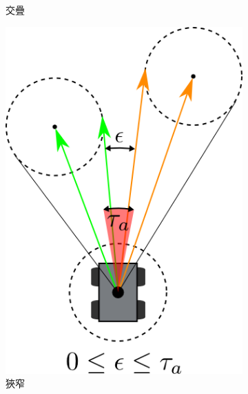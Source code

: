 \begin{figure}[h!]
\begin{subfigure}[t]{0.25\textwidth}
		\caption{交疊}
		\label{f:epsilon_1}
	\end{subfigure}
	\begin{subfigure}[t]{0.3\textwidth}
		\includegraphics[width=\textwidth]{figures/algorithm/epsilon_situation_2}
		\caption{狹窄}
		\label{f:epsilon_2}
	\end{subfigure}
	\begin{subfigure}[t]{0.4\textwidth}

\end{subfigure}
\end{figure}
